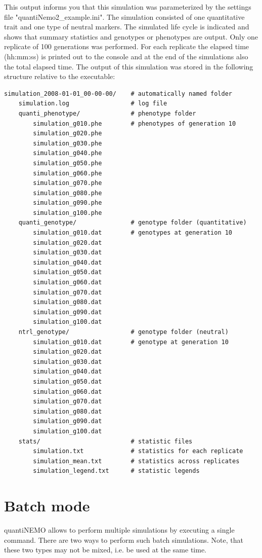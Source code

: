 \documentclass[letterpaper,12pt,oneside]{book}
\begin{document}
This output informs you that this simulation was parameterized by the settings file "quantiNemo2\_example.ini". The simulation consisted of one quantitative trait and one type of neutral markers. The simulated life cycle is indicated and shows that summary statistics and genotypes or phenotypes are output. Only one replicate of 100 generations was performed. For each replicate the elapsed time (hh:mm:ss) is printed out to the console and at the end of the simulations also the total elapsed time. 
The output of this simulation was stored in the following structure relative to the executable:
\begin{lstlisting}[frame=single]
simulation_2008-01-01_00-00-00/    # automatically named folder
    simulation.log                 # log file
    quanti_phenotype/              # phenotype folder 
        simulation_g010.phe        # phenotypes of generation 10
        simulation_g020.phe
        simulation_g030.phe
        simulation_g040.phe
        simulation_g050.phe
        simulation_g060.phe
        simulation_g070.phe
        simulation_g080.phe
        simulation_g090.phe
        simulation_g100.phe
    quanti_genotype/               # genotype folder (quantitative)
        simulation_g010.dat        # genotypes at generation 10
        simulation_g020.dat
        simulation_g030.dat
        simulation_g040.dat
        simulation_g050.dat
        simulation_g060.dat
        simulation_g070.dat
        simulation_g080.dat
        simulation_g090.dat
        simulation_g100.dat
    ntrl_genotype/                 # genotype folder (neutral)
        simulation_g010.dat        # genotype at generation 10
        simulation_g020.dat
        simulation_g030.dat
        simulation_g040.dat
        simulation_g050.dat
        simulation_g060.dat
        simulation_g070.dat
        simulation_g080.dat
        simulation_g090.dat
        simulation_g100.dat
    stats/                         # statistic files
        simulation.txt             # statistics for each replicate
        simulation_mean.txt        # statistics across replicates
        simulation_legend.txt      # statistic legends
\end{lstlisting}

\section{Batch mode}\label{batchMode}
quantiNEMO allows to perform multiple simulations by executing a single command. There are two ways to perform such batch simulations. Note, that these two types may not be mixed, i.e. be used at the same time.
\end{document}
